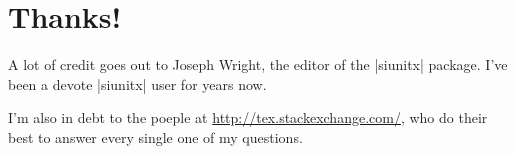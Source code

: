 \documentclass[a4paper,10pt]{article}
\begin{document}
\section{Thanks!}
A lot of credit goes out to Joseph Wright, the editor of the |siunitx| package. I've been a devote |siunitx| user for years now. 

I'm also in debt to the poeple at \url{http://tex.stackexchange.com/}, who do their best to answer every single one of my questions. 


\printindex
\end{document}
